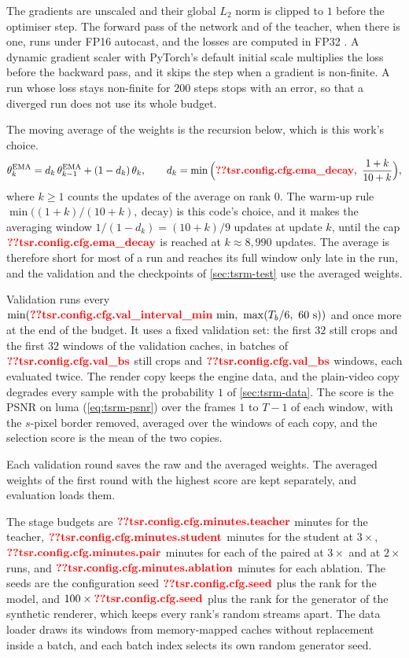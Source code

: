 The gradients are unscaled and their global $L_2$ norm is clipped to $1$ before the optimiser step. The forward pass of the network and of the teacher, when there is one, runs under FP16 autocast, and the losses are computed in FP32 \cite{micikevicius2018mixed}. A dynamic gradient scaler with PyTorch's default initial scale multiplies the loss before the backward pass, and it skips the step when a gradient is non-finite. A run whose loss stays non-finite for $200$ steps stops with an error, so that a diverged run does not use its whole budget.

The moving average of the weights is the recursion below, which is this work's choice.
\begin{equation}\label{eq:tsrm-ema}
\theta^{\mathrm{EMA}}_k=d_k\,\theta^{\mathrm{EMA}}_{k-1}+(1-d_k)\,\theta_k,\qquad d_k=\min\Big(\Res{tsr.config.cfg.ema_decay},\ \frac{1+k}{10+k}\Big),
\end{equation}
where $k\ge1$ counts the updates of the average on rank $0$. The warm-up rule $\min\big((1+k)/(10+k),\ \mathrm{decay}\big)$ is this code's choice, and it makes the averaging window $1/(1-d_k)=(10+k)/9$ updates at update $k$, until the cap $\Res{tsr.config.cfg.ema_decay}$ is reached at $k\approx8{,}990$ updates. The average is therefore short for most of a run and reaches its full window only late in the run, and the validation and the checkpoints of \cref{sec:tsrm-test} use the averaged weights.

Validation runs every $\min(\Res{tsr.config.cfg.val_interval_min}\text{ min},\ \max(T_b/6,\ 60\text{ s}))$ and once more at the end of the budget. It uses a fixed validation set: the first $32$ still crops and the first $32$ windows of the validation caches, in  batches of $\Res{tsr.config.cfg.val_bs}$ still crops and $\Res{tsr.config.cfg.val_bs}$ windows, each evaluated twice. The render copy keeps the engine data, and the plain-video copy degrades every sample with the probability $1$ of \cref{sec:tsrm-data}. The score is the PSNR on luma (\cref{eq:tsrm-psnr}) over the frames $1$ to $T-1$ of each window, with the $s$-pixel border removed, averaged over the windows of each copy, and the selection score is the mean of the two copies.

Each validation round saves the raw and the averaged weights. The averaged weights of the first round with the highest score are kept separately, and evaluation loads them.

The stage budgets are $\Res{tsr.config.cfg.minutes.teacher}$ minutes for the teacher, $\Res{tsr.config.cfg.minutes.student}$ minutes for the  student at $3\times$, $\Res{tsr.config.cfg.minutes.pair}$ minutes for each of the paired  at $3\times$ and  at $2\times$ runs, and $\Res{tsr.config.cfg.minutes.ablation}$ minutes for each ablation. The seeds are the configuration seed $\Res{tsr.config.cfg.seed}$ plus the rank for the model, and $100\times\Res{tsr.config.cfg.seed}$ plus the rank for the generator of the synthetic renderer, which keeps every rank's random streams apart. The data loader draws its windows from memory-mapped caches without replacement inside a batch, and each batch index selects its own random generator seed.

